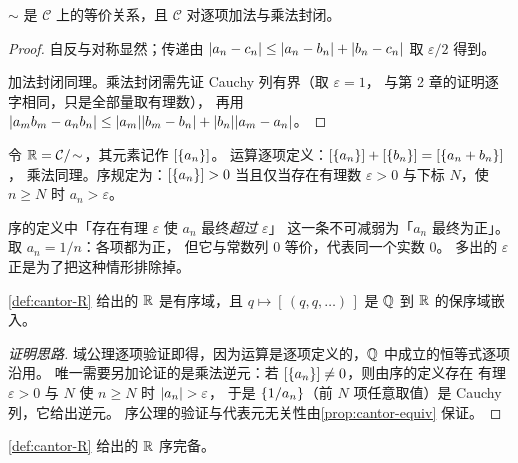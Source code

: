 \begin{proposition}
  \label{prop:cantor-equiv}
  \(\sim\) 是 \(\mathcal{C}\) 上的等价关系，且 \(\mathcal{C}\) 对逐项加法与乘法封闭。
\end{proposition}

\begin{proof}
  自反与对称显然；传递由 \(\lvert a_{n}-c_{n}\rvert \le \lvert a_{n}-b_{n}\rvert+\lvert b_{n}-c_{n}\rvert\)
  取 \(\varepsilon/2\) 得到。

  加法封闭同理。乘法封闭需先证 Cauchy 列有界（取 \(\varepsilon=1\)，
  与第 2 章的证明逐字相同，只是全部量取有理数），
  再用 \(\lvert a_{m}b_{m}-a_{n}b_{n}\rvert \le \lvert a_{m}\rvert\lvert b_{m}-b_{n}\rvert + \lvert b_{n}\rvert\lvert a_{m}-a_{n}\rvert\)。
\end{proof}

\begin{definition}
  \label{def:cantor-R}
  令 \(\mathbb{R} = \mathcal{C}/\!\sim\)，其元素记作 \([\{a_{n}\}]\)。
  运算逐项定义：\([\{a_{n}\}] + [\{b_{n}\}] = [\{a_{n}+b_{n}\}]\)，
  乘法同理。序规定为：\([\{a_{n}\}] > 0\) 当且仅当存在有理数 \(\varepsilon>0\)
  与下标 \(N\)，使 \(n \ge N\) 时 \(a_{n} > \varepsilon\)。
\end{definition}

\begin{remark}
  序的定义中「存在有理 \(\varepsilon\) 使 \(a_{n}\) 最终\emph{超过} \(\varepsilon\)」
  这一条不可减弱为「\(a_{n}\) 最终为正」。取 \(a_{n} = 1/n\)：各项都为正，
  但它与常数列 \(0\) 等价，代表同一个实数 \(0\)。
  多出的 \(\varepsilon\) 正是为了把这种情形排除掉。
\end{remark}

\begin{theorem}
  \label{thm:cantor-field}
  \cref{def:cantor-R} 给出的 \(\mathbb{R}\) 是有序域，且 \(q \mapsto [\,(q,q,\dots)\,]\)
  是 \(\mathbb{Q}\) 到 \(\mathbb{R}\) 的保序域嵌入。
\end{theorem}

\begin{proof}[证明思路]
  域公理逐项验证即得，因为运算是逐项定义的，\(\mathbb{Q}\) 中成立的恒等式逐项沿用。
  唯一需要另加论证的是乘法逆元：若 \([\{a_{n}\}] \neq 0\)，则由序的定义存在
  有理 \(\varepsilon>0\) 与 \(N\) 使 \(n \ge N\) 时 \(\lvert a_{n}\rvert > \varepsilon\)，
  于是 \(\{1/a_{n}\}\)（前 \(N\) 项任意取值）是 Cauchy 列，它给出逆元。
  序公理的验证与代表元无关性由\cref{prop:cantor-equiv} 保证。
\end{proof}

\begin{theorem}
  \label{thm:cantor-complete}
  \cref{def:cantor-R} 给出的 \(\mathbb{R}\) 序完备。
\end{theorem}

